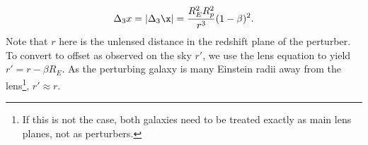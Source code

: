 \begin{equation}
\Delta_3 x = | \Delta_3 \x| = \frac{R_E^2 R_p^2}{r^3} (1 - \beta)^2. 
\label{eq:backgroundd3x}
\end{equation}
Note that $r$ here is the unlensed distance in the redshift plane of the perturber. To convert to offset as observed on the sky $r'$, we use the lens equation to yield $r' = r - \beta R_E$. As the perturbing galaxy is many Einstein radii away from the lens\footnote{If this is not the case, both galaxies need to be treated exactly as main lens planes, not as perturbers.}, $r' \approx r$.
